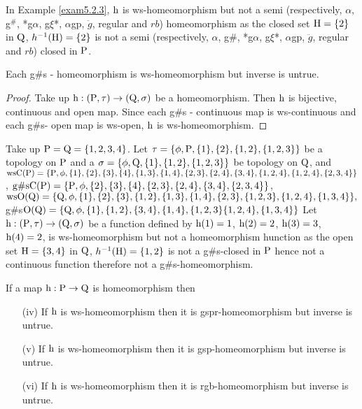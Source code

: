 \begin{exm}\label{exam5.2.6}
In Example \ref{exam5.2.3}, $\mathrm{h}$ is ws-homeomorphism but not a semi (respectively, $\alpha$, g$^{\#}$, *g$\alpha$, g$\xi$*, $\alpha$gp, $\ddot{g}$, regular and $rb$) homeomorphism as the closed set $\mathrm{H}=\{2\}$ in $\mathrm{Q}$, $h^{-1} (\mathrm{H})=\{2\}$ is not a semi (respectively, $\alpha$, g\#, *g$\alpha$, g$\xi$*, $\alpha$gp, $\ddot{g}$, regular and $rb$) closed in $\mathrm{P}$.
\end{exm}

\begin{thm}\label{thm5.2.7}
Each g\#s - homeomorphism is ws-homeomorphism but inverse is untrue.
\end{thm}

\begin{proof}
Take up $\mathrm{h}: (\mathrm{P}, \tau) \to (\mathrm{Q}, \sigma)$ be a homeomorphism. Then $\mathrm{h}$ is bijective, continuous and open map. Since each g\#s - continuous map is ws-continuous and each g\#s- open map is ws-open, $\mathrm{h}$ is ws-homeomorphism.
\end{proof}

\begin{exm}\label{exam5.2.8}
Take up $\mathrm{P}=\mathrm{Q}= \{1, 2, 3, 4\}$. Let $\tau= \{\phi, \TSP, \{1\}, \{2\}, \{1, 2\},\break \{1,2,3\}\}$ be a topology on $\mathrm{P}$ and a $\sigma=\{\phi,\mathrm{Q},\{1\},\{1,2\},\{1,2,3\}\}$ be topology on $\mathrm{Q}$, and $\ws\TSC(\TSP)=\{\TSP,\phi,\{1\},\{2\},\{3\},\{4\},\{1,3\},\{1,4\},\{2,3\},\{2,4\},\{3,4\},\{1,2,4\},\break \{1,2,4\},\{2,3,4\}\}$, $\text{g\#s}\mathrm{C}(\mathrm{P})=\{\mathrm{P}, \phi,\{2\},\{3\},\{4\},\{2,3\},\{2,4\},\{3,4\},\{2,3,4\}\}$,\break $\mathrm{ws}\mathrm{O}(\mathrm{Q})=\{\mathrm{Q}, \phi, \{1\},\{2\},\{3\},\{1,2\}, \{1,3\},\{1,4\},\{2,3\},\{1,2,3\}, \{1,2,4\}, \{1,3,4\}\},$ g\#s$\mathrm{O}(\mathrm{Q})=\{\mathrm{Q},\phi,\{1\},\{1,2\},\{3,4\},\{1,4\},\{1,2,3\}\{1,2,4\},\{1,3,4\}\}$ Let $\TSh: (\TSP, \tau )\break \to (\TSQ, \sigma)$ be a function defined by $\mathrm{h}(1)= 1$, $\mathrm{h}(2)=2$, $\mathrm{h}(3)=3$, $\mathrm{h}(4)=2$, is ws-homeomorphism but not a homeomorphism hunction as the open set $\mathrm{H}=\{3,4\}$ in $\mathrm{Q}$, $h^{-1} (\mathrm{H})=\{1,2\}$ is not a g\#s-closed in $\mathrm{P}$ hence not a continuous function therefore not a g\#s-homeomorphism.
\end{exm}

\begin{thm}\label{thm5.2.9}
If a map $\mathrm{h}: \mathrm{P}\to \mathrm{Q}$ is homeomorphism then
\begin{itemize}
\item[(iv)] If $\mathrm{h}$ is ws-homeomorphism then it is gspr-homeomorphism but inverse is untrue.
\item[(v)] If $\mathrm{h}$ is ws-homeomorphism then it is gsp-homeomorphism but inverse is untrue.
\item[(vi)] If $\mathrm{h}$ is ws-homeomorphism then it is rgb-homeomorphism but inverse is untrue.
\end{itemize}
\end{thm}

